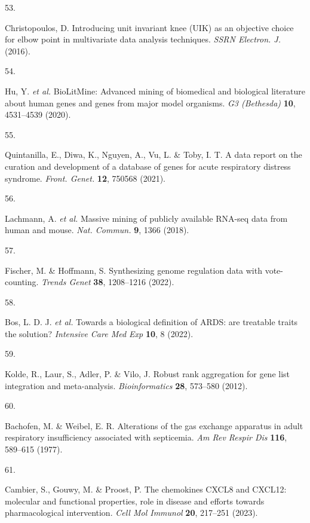 \documentclass[
  11,
  a4paper,
]{article}
\newlength{\cslhangindent}
\newlength{\csllabelwidth}
\newenvironment{CSLReferences}[2] %
 {\begin{list}{}{%
  \setlength{\itemindent}{0pt}
  \setlength{\leftmargin}{0pt}
  \setlength{\parsep}{0pt}
  \ifodd #1
   \setlength{\leftmargin}{\cslhangindent}
   \setlength{\itemindent}{-1\cslhangindent}
  \fi
  \setlength{\itemsep}{#2\baselineskip}}}
 {\end{list}}
\newcommand{\CSLLeftMargin}[1]{\parbox[t]{\csllabelwidth}{\strut#1\strut}}
\newcommand{\CSLRightInline}[1]{\parbox[t]{\linewidth - \csllabelwidth}{\strut#1\strut}}
\begin{document}
\begin{CSLReferences}{0}{0}
\CSLLeftMargin{53. }%
\CSLRightInline{Christopoulos, D. Introducing unit invariant knee
({UIK}) as an objective choice for elbow point in multivariate data
analysis techniques. \emph{SSRN Electron. J.} (2016).}

\CSLLeftMargin{54. }%
\CSLRightInline{Hu, Y. \emph{et al.} {BioLitMine}: Advanced mining of
biomedical and biological literature about human genes and genes from
major model organisms. \emph{G3 (Bethesda)} \textbf{10}, 4531--4539
(2020).}

\CSLLeftMargin{55. }%
\CSLRightInline{Quintanilla, E., Diwa, K., Nguyen, A., Vu, L. \& Toby,
I. T. A data report on the curation and development of a database of
genes for acute respiratory distress syndrome. \emph{Front. Genet.}
\textbf{12}, 750568 (2021).}

\CSLLeftMargin{56. }%
\CSLRightInline{Lachmann, A. \emph{et al.} Massive mining of publicly
available {RNA-seq} data from human and mouse. \emph{Nat. Commun.}
\textbf{9}, 1366 (2018).}

\CSLLeftMargin{57. }%
\CSLRightInline{Fischer, M. \& Hoffmann, S. {{S}ynthesizing genome
regulation data with vote-counting}. \emph{Trends Genet} \textbf{38},
1208--1216 (2022).}

\CSLLeftMargin{58. }%
\CSLRightInline{Bos, L. D. J. \emph{et al.} {{T}owards a biological
definition of {A}{R}{D}{S}: are treatable traits the solution?}
\emph{Intensive Care Med Exp} \textbf{10}, 8 (2022).}

\CSLLeftMargin{59. }%
\CSLRightInline{Kolde, R., Laur, S., Adler, P. \& Vilo, J. {{R}obust
rank aggregation for gene list integration and meta-analysis}.
\emph{Bioinformatics} \textbf{28}, 573--580 (2012).}

\CSLLeftMargin{60. }%
\CSLRightInline{Bachofen, M. \& Weibel, E. R. {{A}lterations of the gas
exchange apparatus in adult respiratory insufficiency associated with
septicemia}. \emph{Am Rev Respir Dis} \textbf{116}, 589--615 (1977).}

\CSLLeftMargin{61. }%
\CSLRightInline{Cambier, S., Gouwy, M. \& Proost, P. {{T}he chemokines
{C}{X}{C}{L}8 and {C}{X}{C}{L}12: molecular and functional properties,
role in disease and efforts towards pharmacological intervention}.
\emph{Cell Mol Immunol} \textbf{20}, 217--251 (2023).}


\end{CSLReferences}
\end{document}
